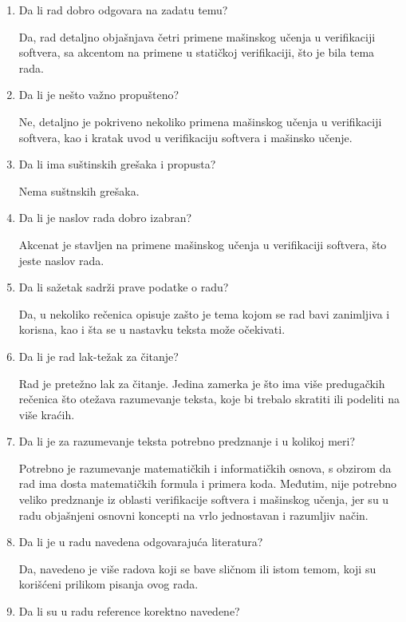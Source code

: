 \documentclass[a4paper]{report}
\begin{document}
\begin{enumerate}
\item Da li rad dobro odgovara na zadatu temu?

Da, rad detaljno objašnjava četri primene mašinskog učenja u verifikaciji softvera, sa akcentom na primene u statičkoj verifikaciji, što je bila tema rada.

\item Da li je nešto važno propušteno?

Ne, detaljno je pokriveno nekoliko primena mašinskog učenja u verifikaciji softvera, kao i kratak uvod u verifikaciju softvera i mašinsko učenje.

\item Da li ima suštinskih grešaka i propusta?

Nema suštnskih grešaka.

\item Da li je naslov rada dobro izabran?

Akcenat je stavljen na primene mašinskog učenja u verifikaciji softvera, što jeste naslov rada.

\item Da li sažetak sadrži prave podatke o radu?

Da, u nekoliko rečenica opisuje zašto je tema kojom se rad bavi zanimljiva i korisna, kao i šta se u nastavku teksta može očekivati.

\item Da li je rad lak-težak za čitanje?

Rad je pretežno lak za čitanje. Jedina zamerka je što ima više predugačkih rečenica što otežava razumevanje teksta, koje bi trebalo skratiti ili podeliti na više kraćih.

\item Da li je za razumevanje teksta potrebno predznanje i u kolikoj meri?

Potrebno je razumevanje matematičkih i informatičkih osnova, s obzirom da rad ima dosta matematičkih formula i primera koda. Međutim, nije potrebno veliko predznanje iz oblasti verifikacije softvera i mašinskog učenja, jer su u radu objašnjeni osnovni koncepti na vrlo jednostavan i razumljiv način.

\item Da li je u radu navedena odgovarajuća literatura?

Da, navedeno je više radova koji se bave sličnom ili istom temom, koji su korišćeni prilikom pisanja ovog rada.

\item Da li su u radu reference korektno navedene?


\end{enumerate}
\end{document}
